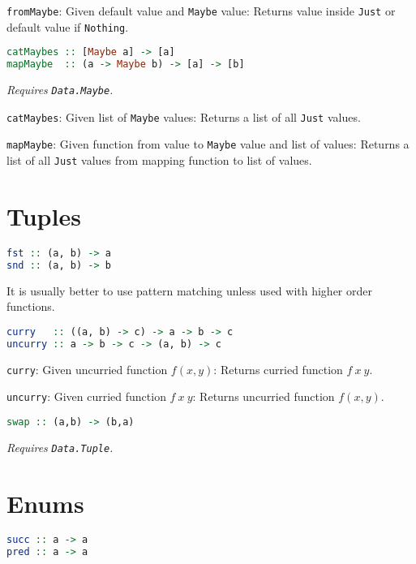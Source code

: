 \documentclass[twocolumn,english]{article}
\begin{document}
\texttt{fromMaybe}: Given default value and \texttt{Maybe} value:
Returns value inside \texttt{Just} or default value if \texttt{Nothing}.
\begin{lstlisting}[language=Haskell,frame=single]
catMaybes :: [Maybe a] -> [a]
mapMaybe  :: (a -> Maybe b) -> [a] -> [b]
\end{lstlisting}


\emph{Requires }\texttt{\emph{Data.Maybe}}\emph{. }

\texttt{catMaybes}: Given list of \texttt{Maybe} values: Returns a
list of all \texttt{Just} values.

\texttt{mapMaybe}: Given function from value to \texttt{Maybe} value
and list of values: Returns a list of all \texttt{Just} values from
mapping function to list of values.


\section{Tuples}

\begin{lstlisting}[language=Haskell,frame=single]
fst :: (a, b) -> a
snd :: (a, b) -> b
\end{lstlisting}


It is usually better to use pattern matching unless used with higher
order functions.

\begin{lstlisting}[language=Haskell,frame=single]
curry   :: ((a, b) -> c) -> a -> b -> c
uncurry :: a -> b -> c -> (a, b) -> c
\end{lstlisting}


\texttt{curry}: Given uncurried function $f(x,y)$: Returns curried
function $f\:x\:y$.

\texttt{uncurry}: Given curried function $f\:x\:y$: Returns uncurried
function $f(x,y)$.
\begin{lstlisting}[language=Haskell,frame=single]
swap :: (a,b) -> (b,a)
\end{lstlisting}


\emph{Requires }\texttt{\emph{Data.Tuple}}\emph{.}


\section{Enums}

\begin{lstlisting}[language=Haskell,frame=single]
succ :: a -> a
pred :: a -> a
\end{lstlisting}
\end{document}
